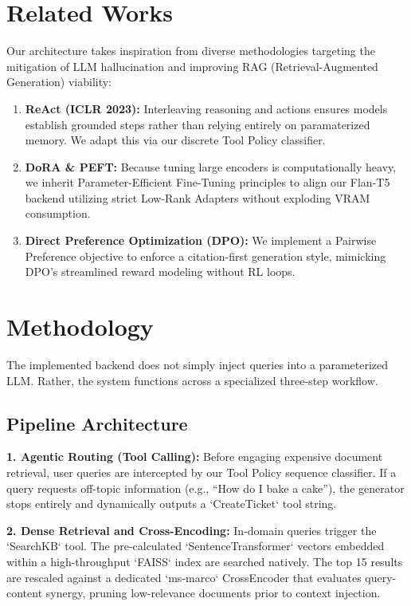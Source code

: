 \documentclass[11pt]{article}
\begin{document}
\section{Related Works}
Our architecture takes inspiration from diverse methodologies targeting the mitigation of LLM hallucination and improving RAG (Retrieval-Augmented Generation) viability:
\begin{enumerate}
    \item \textbf{ReAct (ICLR 2023):} Interleaving reasoning and actions ensures models establish grounded steps rather than relying entirely on paramaterized memory. We adapt this via our discrete Tool Policy classifier.
    \item \textbf{DoRA \& PEFT:} Because tuning large encoders is computationally heavy, we inherit Parameter-Efficient Fine-Tuning principles to align our Flan-T5 backend utilizing strict Low-Rank Adapters without exploding VRAM consumption.
    \item \textbf{Direct Preference Optimization (DPO):} We implement a Pairwise Preference objective to enforce a citation-first generation style, mimicking DPO's streamlined reward modeling without RL loops.
\end{enumerate}

\section{Methodology}

The implemented backend does not simply inject queries into a parameterized LLM. Rather, the system functions across a specialized three-step workflow.

\subsection{Pipeline Architecture}
\textbf{1. Agentic Routing (Tool Calling):} 
Before engaging expensive document retrieval, user queries are intercepted by our Tool Policy sequence classifier. If a query requests off-topic information (e.g., ``How do I bake a cake''), the generator stops entirely and dynamically outputs a `CreateTicket` tool string.

\textbf{2. Dense Retrieval and Cross-Encoding:} 
In-domain queries trigger the `SearchKB` tool. The pre-calculated `SentenceTransformer` vectors embedded within a high-throughput `FAISS` index are searched natively. The top 15 results are rescaled against a dedicated `ms-marco` CrossEncoder that evaluates query-content synergy, pruning low-relevance documents prior to context injection.
\end{document}
